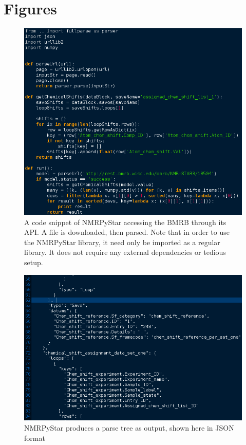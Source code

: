 \section{Figures}

\begin{figure}[h]
  \includegraphics[scale=0.5]{figures/nmrpystar_bmrb}
  \caption[A code snippet of NMRPyStar]
          {A code snippet of NMRPyStar accessing the BMRB through its API.
           A file is downloaded, then parsed.  Note that in order to use
           the NMRPyStar library, it need only be imported as a regular
           library.  It does not require any external dependencies or
           tedious setup.}
  \label{nmrpystar_bmrb}
\end{figure}

\begin{figure}
  \includegraphics[scale=0.5]{figures/nmrpystar_json}
  \caption[NMRPyStar produces a parse tree as output]
          {NMRPyStar produces a parse tree as output, shown here in JSON format}
  \label{nmrpystar_json}
\end{figure}

